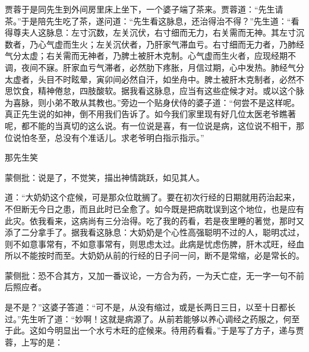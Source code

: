 \begin{parag}
    贾蓉于是同先生到外间房里床上坐下，一个婆子端了茶来。贾蓉道：“先生请茶。”于是陪先生吃了茶，遂问道：“先生看这脉息，还治得治不得？”先生道：“看得尊夫人这脉息：左寸沉数，左关沉伏，右寸细而无力，右关需而无神。其左寸沉数者，乃心气虚而生火；左关沉伏者，乃肝家气滞血亏。右寸细而无力者，乃肺经气分太虚；右关需而无神者，乃脾土被肝木克制。心气虚而生火者，应现经期不调，夜间不寐。肝家血亏气滞者，必然肋下疼胀，月信过期，心中发热。肺经气分太虚者，头目不时眩晕，寅卯间必然自汗，如坐舟中。脾土被肝木克制者，必然不思饮食，精神倦怠，四肢酸软。据我看这脉息，应当有这些症候才对。或以这个脉为喜脉，则小弟不敢从其教也。”旁边一个贴身伏侍的婆子道：“何尝不是这样呢。真正先生说的如神，倒不用我们告诉了。如今我们家里现有好几位太医老爷瞧著呢，都不能的当真切的这么说。有一位说是喜，有一位说是病，这位说不相干，那位说怕冬至，总没有个准话儿。求老爷明白指示指示。”
\end{parag}


\begin{parag}
    那先生笑\begin{note}蒙侧批：说是了，不觉笑，描出神情跳跃，如见其人。\end{note}道：“大奶奶这个症候，可是那众位耽搁了。要在初次行经的日期就用药治起来，不但断无今日之患，而且此时已全愈了。如今既是把病耽误到这个地位，也是应有此灾。依我看来，这病尚有三分治得。吃了我的药看，若是夜里睡的著觉，那时又添了二分拿手了。据我看这脉息：大奶奶是个心性高强聪明不过的人，聪明忒过，则不如意事常有，不如意事常有，则思虑太过。此病是忧虑伤脾，肝木忒旺，经血所以不能按时而至。大奶奶从前的行经的日子问一问，断不是常缩，必是常长的。\begin{note}蒙侧批：恐不合其方，又加一番议论，一方合为药，一为夭亡症，无一字一句不前后照应者。\end{note}是不是？”这婆子答道：“可不是，从没有缩过，或是长两日三日，以至十日都长过。”先生听了道：“妙啊！这就是病源了。从前若能够以养心调经之药服之，何至于此。这如今明显出一个水亏木旺的症候来。待用药看看。”于是写了方子，递与贾蓉，上写的是：
\end{parag}

